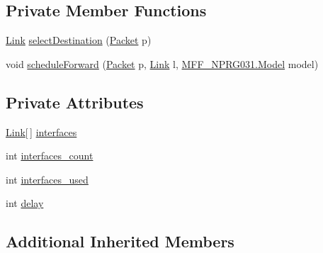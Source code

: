 \subsection*{Private Member Functions}
\begin{DoxyCompactItemize}
\item 
\hyperlink{classNetTrafficSimulator_1_1Link}{Link} \hyperlink{classNetTrafficSimulator_1_1NetworkNode_a7a6ad43dc664a81f590da8451f8f3b78}{select\-Destination} (\hyperlink{classNetTrafficSimulator_1_1Packet}{Packet} p)
\item 
void \hyperlink{classNetTrafficSimulator_1_1NetworkNode_a87e1e7c4b163bc96de4ccad302810b2c}{schedule\-Forward} (\hyperlink{classNetTrafficSimulator_1_1Packet}{Packet} p, \hyperlink{classNetTrafficSimulator_1_1Link}{Link} l, \hyperlink{classMFF__NPRG031_1_1Model}{M\-F\-F\-\_\-\-N\-P\-R\-G031.\-Model} model)
\end{DoxyCompactItemize}
\subsection*{Private Attributes}
\begin{DoxyCompactItemize}
\item 
\hyperlink{classNetTrafficSimulator_1_1Link}{Link}\mbox{[}$\,$\mbox{]} \hyperlink{classNetTrafficSimulator_1_1NetworkNode_a88683a8c65aadc6222a5898dcb1735d6}{interfaces}
\item 
int \hyperlink{classNetTrafficSimulator_1_1NetworkNode_af9b9d881f9c1b02749716bb12efb5f66}{interfaces\-\_\-count}
\item 
int \hyperlink{classNetTrafficSimulator_1_1NetworkNode_a2a2522005483827b9b7d3b51e7ffc47b}{interfaces\-\_\-used}
\item 
int \hyperlink{classNetTrafficSimulator_1_1NetworkNode_aa31e2256ee97c759bd5f32652a5c00fc}{delay}
\end{DoxyCompactItemize}
\subsection*{Additional Inherited Members}


